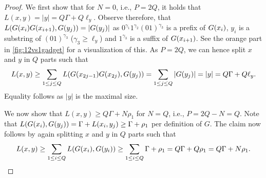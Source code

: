 \begin{proof}
We first show that for $N=0$, i.e., $P=2Q$, it holds that $L(x,y) = |y| = Q\Gamma + Q\ell_y$.
Observe therefore, that $L(G(x_i)G(x_{i+1}), G(y_j)) = |G(y_j)|$ as $0^{\gamma_1}1^{\gamma_2}(01)^{\gamma_3}$ is a prefix of $G(x_i)$, $y_i$ is a substring of $(01)^{\gamma_3}$ ($\gamma_3 \geq \ell_y$) and $1^{\gamma_3}$ is a suffix of $G(x_{i+1})$. See the orange part in \autoref{fig:12vs1gadget} for a visualization of this.
As $P = 2Q$, we can hence split $x$ and $y$ in $Q$ parts such that
\[
	L(x,y) \geq \sum_{1\leq j \leq Q} L(G(x_{2j-1})G(x_{2j}), G(y_j)) = \sum_{1\leq j \leq Q} |G(y_j)| = |y| = Q\Gamma + Q\ell_y.
\]
Equality follows as $|y|$ is the maximal \lcs{} size.

We now show that $L(x,y) \geq Q\Gamma + N\rho_1$ for $N=Q$, i.e., $P=2Q - N = Q$.
Note that $L(G(x_i), G(y_j)) = \Gamma + L(x_i, y_j) \geq \Gamma + \rho_1$ per definition of $G$.
The claim now follows by again splitting $x$ and $y$ in $Q$ parts such that
\[
	L(x,y) \geq \sum_{1\leq i \leq Q} L(G(x_i), G(y_i)) \geq \sum_{1 \leq i \leq Q} \Gamma + \rho_1 = Q\Gamma + Q\rho_1 = Q\Gamma + N\rho_1.
\]



\end{proof}
